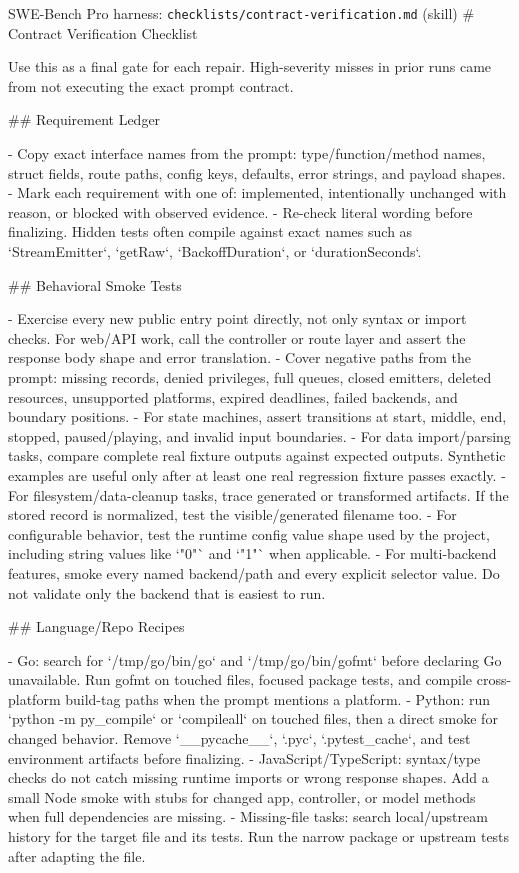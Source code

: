 \documentclass{llmxive}
\begin{document}
\begin{promptbox}{SWE-Bench Pro harness: \texttt{checklists/contract-verification.md} (skill)}
# Contract Verification Checklist

Use this as a final gate for each repair. High-severity misses in prior runs
came from not executing the exact prompt contract.

## Requirement Ledger

- Copy exact interface names from the prompt: type/function/method names,
  struct fields, route paths, config keys, defaults, error strings, and payload
  shapes.
- Mark each requirement with one of: implemented, intentionally unchanged with
  reason, or blocked with observed evidence.
- Re-check literal wording before finalizing. Hidden tests often compile
  against exact names such as `StreamEmitter`, `getRaw`, `BackoffDuration`, or
  `durationSeconds`.

## Behavioral Smoke Tests

- Exercise every new public entry point directly, not only syntax or import
  checks. For web/API work, call the controller or route layer and assert the
  response body shape and error translation.
- Cover negative paths from the prompt: missing records, denied privileges,
  full queues, closed emitters, deleted resources, unsupported platforms,
  expired deadlines, failed backends, and boundary positions.
- For state machines, assert transitions at start, middle, end, stopped,
  paused/playing, and invalid input boundaries.
- For data import/parsing tasks, compare complete real fixture outputs against
  expected outputs. Synthetic examples are useful only after at least one real
  regression fixture passes exactly.
- For filesystem/data-cleanup tasks, trace generated or transformed artifacts.
  If the stored record is normalized, test the visible/generated filename too.
- For configurable behavior, test the runtime config value shape used by the
  project, including string values like `"0"` and `"1"` when applicable.
- For multi-backend features, smoke every named backend/path and every explicit
  selector value. Do not validate only the backend that is easiest to run.

## Language/Repo Recipes

- Go: search for `/tmp/go/bin/go` and `/tmp/go/bin/gofmt` before declaring Go
  unavailable. Run gofmt on touched files, focused package tests, and compile
  cross-platform build-tag paths when the prompt mentions a platform.
- Python: run `python -m py_compile` or `compileall` on touched files, then a
  direct smoke for changed behavior. Remove `__pycache__`, `.pyc`, `.pytest_cache`,
  and test environment artifacts before finalizing.
- JavaScript/TypeScript: syntax/type checks do not catch missing runtime imports
  or wrong response shapes. Add a small Node smoke with stubs for changed app,
  controller, or model methods when full dependencies are missing.
- Missing-file tasks: search local/upstream history for the target file and its
  tests. Run the narrow package or upstream tests after adapting the file.


\end{promptbox}
\end{document}
